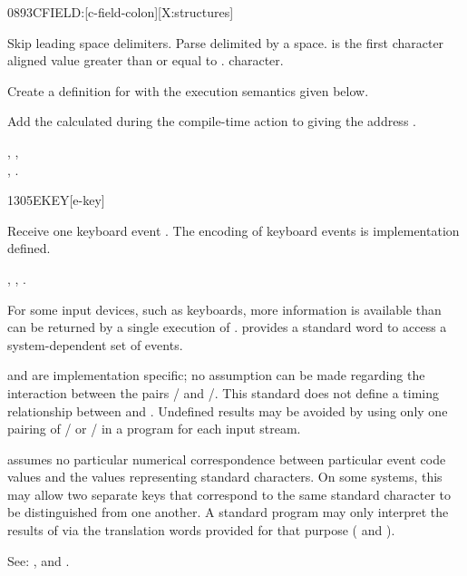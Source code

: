 \begin{worddef}{0893}{CFIELD:}[c-field-colon][X:structures]
\item {}

	Skip leading space delimiters. Parse  delimited by
	a space.  is the first character aligned value
	greater than or equal to .  
	character.

	Create a definition for  with the execution semantics
	given below.

\execute[name]

	Add the  calculated during the compile-time action to
	 giving the address .

\see {},
	, \\
	,
	.
\end{worddef}


\begin{worddef}{1305}{EKEY}[e-key]
\item {}

	Receive one keyboard event . The encoding of keyboard events
	is implementation defined.

\see {},
	,
	.


	\begin{rationale} %
		For some input devices, such as keyboards, more information is
		available than can be returned by a single execution of
		.   provides a standard word to access a
		system-dependent set of events.

		 and  are implementation specific; no
		assumption can be made regarding the interaction between the
		pairs / and /.
		This standard does not define a timing relationship between
		 and .  Undefined results may be
		avoided by using only one pairing of / 
		or / in a program for each input
		stream.

		 assumes no particular numerical correspondence
		between particular event code values and the values
		representing standard characters.  On some systems, this may
		allow two separate keys that correspond to the same standard
		character to be distinguished from one another.  A standard
		program may only interpret the results of  via the
		translation words provided for that purpose
		( and ).

		See: ,  and
		.
	\end{rationale}
\end{worddef}


